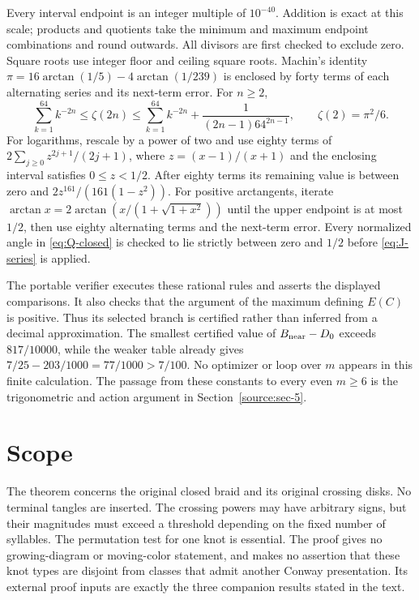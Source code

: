 \documentclass[11pt]{article}
\numberwithin{equation}{section}
\begin{document}
Every interval endpoint is an integer multiple of \(10^{-40}\).
Addition is exact at this scale; products and quotients take the
minimum and maximum endpoint combinations and round outwards.
All divisors are first checked to exclude zero. Square roots use
integer floor and ceiling square roots. Machin's identity
\(\pi=16\arctan(1/5)-4\arctan(1/239)\) is enclosed by forty terms
of each alternating series and its next-term error. For \(n\ge2\),
\[
 \sum_{k=1}^{64}k^{-2n}\le\zeta(2n)
 \le\sum_{k=1}^{64}k^{-2n}
       +\frac{1}{(2n-1)64^{2n-1}},
 \qquad\zeta(2)=\pi^2/6.
\]
For logarithms, rescale by a power of two and use eighty terms of
\(2\sum_{j\ge0}z^{2j+1}/(2j+1)\), where
\(z=(x-1)/(x+1)\) and the enclosing interval satisfies \(0\le z<1/2\).
After eighty terms its remaining value is between zero and
\(2z^{161}/(161(1-z^2))\). For positive arctangents, iterate
\(\arctan x=2\arctan(x/(1+\sqrt{1+x^2}))\) until the upper endpoint
is at most \(1/2\), then use eighty alternating terms and the
next-term error. Every normalized angle in \eqref{eq:Q-closed} is
checked to lie strictly between zero and \(1/2\) before
\eqref{eq:J-series} is applied.

The portable verifier \cite{Constants} executes these rational rules
and asserts the displayed comparisons. It also checks that the argument
of the maximum defining \(E(C)\) is positive. Thus its selected branch
is certified rather than inferred from a decimal approximation.
The smallest certified value of
\(B_{\rm near}-D_0\) exceeds \(817/10000\), while the weaker
table already gives \(7/25-203/1000=77/1000>7/100\).
No optimizer or loop over \(m\) appears in this finite calculation.
The passage from these constants to every even \(m\ge6\) is the
trigonometric and action argument in Section~\ref{source:sec-5}.

\section*{Scope}
The theorem concerns the original closed braid and its original crossing
disks. No terminal tangles are inserted. The crossing powers may have
arbitrary signs, but their magnitudes must exceed a threshold depending
on the fixed number of syllables. The permutation test for one knot is
essential. The proof gives no growing-diagram or moving-color statement,
and makes no assertion that these knot types are disjoint from classes
that admit another Conway presentation. Its external proof inputs are
exactly the three companion results stated in the text.
\end{document}
